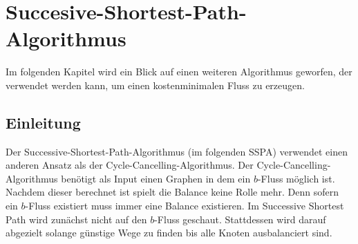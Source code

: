 \chapter{Succesive-Shortest-Path-Algorithmus}
Im folgenden Kapitel wird ein Blick auf einen weiteren Algorithmus geworfen, der verwendet werden kann, um einen kostenminimalen Fluss zu erzeugen.
\section{Einleitung}
Der Successive-Shortest-Path-Algorithmus (im folgenden SSPA) verwendet einen anderen Ansatz als der Cycle-Cancelling-Algorithmus. Der Cycle-Cancelling-Algorithmus benötigt als Input einen Graphen in dem ein $b$-Fluss möglich ist. Nachdem dieser berechnet ist spielt die Balance keine Rolle mehr. Denn sofern ein $b$-Fluss existiert muss immer eine Balance existieren. %
Im Successive Shortest Path wird zunächst nicht auf den $b$-Fluss geschaut. Stattdessen wird darauf abgezielt solange günstige Wege zu finden bis alle Knoten ausbalanciert sind.

